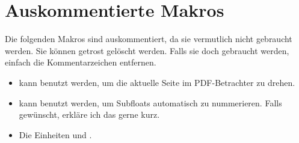 \section{Auskommentierte Makros}
Die folgenden Makros sind auskommentiert, da sie vermutlich nicht gebraucht werden.
Sie können getrost gelöscht werden.
Falls sie doch gebraucht werden, einfach die Kommentarzeichen entfernen.
\begin{itemize}
  \item \texttt{\string\thispagepdflscape} kann benutzt werden, um die aktuelle Seite im PDF-Betrachter zu drehen.

  \item \texttt{\string\tagsubfloats} kann benutzt werden, um Subfloats automatisch zu nummerieren.
    Falls gewünscht, erkläre ich das gerne kurz.

  \item Die Einheiten \texttt{\string\dBm} und \texttt{\string\Phizero}.
\end{itemize}

\makedocumentend


